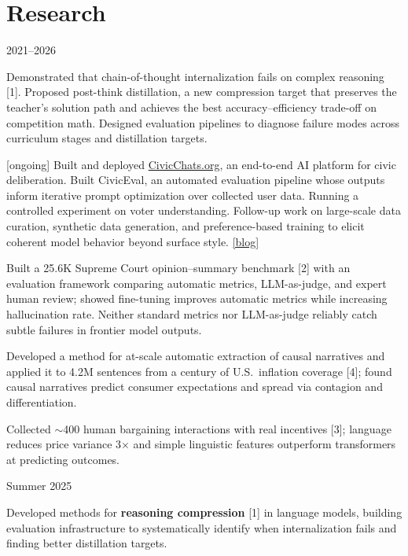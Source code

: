 \documentclass[11pt,letterpaper]{article}
\begin{document}
\section*{Research}
\vspace{4pt}
 \hfill 2021--2026
\begin{cvitems}
    \item Demonstrated that chain-of-thought internalization fails on complex reasoning [1]. Proposed post-think distillation, a new compression target that preserves the teacher's solution path and achieves the best accuracy--efficiency trade-off on competition math. Designed evaluation pipelines to diagnose failure modes across curriculum stages and distillation targets.
    \item {[ongoing]} Built and deployed \href{https://civicchats.org}{CivicChats.org}, an end-to-end AI platform for civic deliberation. Built CivicEval, an automated evaluation pipeline whose outputs inform iterative prompt optimization over collected user data. Running a controlled experiment on voter understanding. Follow-up work on large-scale data curation, synthetic data generation, and preference-based training to elicit coherent model behavior beyond surface style. \href{https://open.substack.com/pub/cichicago/p/civicchats-building-ai-to-support}{[blog]}
    \item Built a 25.6K Supreme Court opinion--summary benchmark [2] with an evaluation framework comparing automatic metrics, LLM-as-judge, and expert human review; showed fine-tuning improves automatic metrics while increasing hallucination rate. Neither standard metrics nor LLM-as-judge reliably catch subtle failures in frontier model outputs.
    \item Developed a method for at-scale automatic extraction of causal narratives and applied it to 4.2M sentences from a century of U.S.\ inflation coverage [4]; found causal narratives predict consumer expectations and spread via contagion and differentiation.
    \item Collected $\sim$400 human bargaining interactions with real incentives [3]; language reduces price variance 3$\times$ and simple linguistic features outperform transformers at predicting outcomes.
\end{cvitems}

\vspace{4pt}
 \hfill Summer 2025
\begin{cvitems}
    \item Developed methods for \textbf{reasoning compression} [1] in language models, building evaluation infrastructure to systematically identify when internalization fails and finding better distillation targets.
\end{cvitems}
\end{document}
